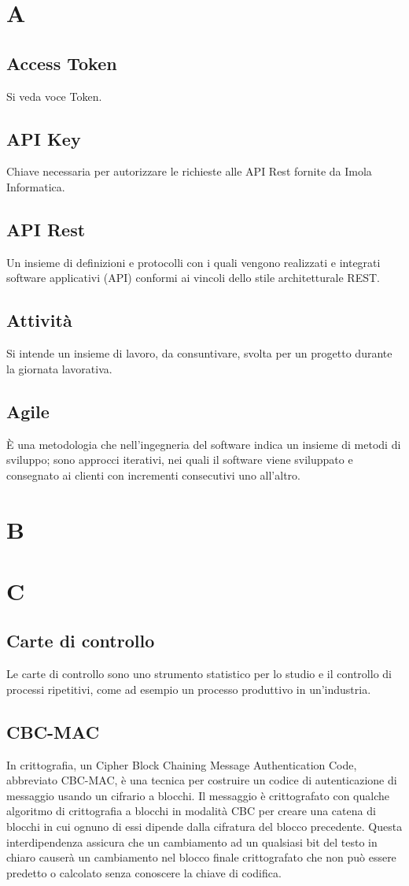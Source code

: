 \section{A}
\subsection{Access Token}
Si veda voce Token.
\subsection{API Key}
Chiave necessaria per autorizzare le richieste alle API Rest fornite da Imola Informatica.
\subsection{API Rest}
Un insieme di definizioni e protocolli con i quali vengono realizzati e integrati software applicativi (API) conformi ai vincoli dello stile architetturale REST.
\subsection{Attività}
Si intende un insieme di lavoro, da consuntivare, svolta per un progetto durante la giornata lavorativa.
\subsection{Agile}
È una metodologia che nell'ingegneria del software indica un insieme di metodi di sviluppo; sono approcci iterativi, nei quali il software viene sviluppato e consegnato ai clienti con incrementi consecutivi uno all'altro.
\newpage
\section{B}
\section{C}
\subsection{Carte di controllo}
Le carte di controllo sono uno strumento statistico per lo studio e il controllo di processi ripetitivi, come ad esempio un processo produttivo in un'industria.
\subsection{CBC-MAC}
In crittografia, un Cipher Block Chaining Message Authentication Code, abbreviato CBC-MAC, è una tecnica per costruire un codice di autenticazione di messaggio usando un cifrario a blocchi. Il messaggio è crittografato con qualche algoritmo di crittografia a blocchi in modalità CBC per creare una catena di blocchi in cui ognuno di essi dipende dalla cifratura del blocco precedente. Questa interdipendenza assicura che un cambiamento ad un qualsiasi bit del testo in chiaro causerà un cambiamento nel blocco finale crittografato che non può essere predetto o calcolato senza conoscere la chiave di codifica.
